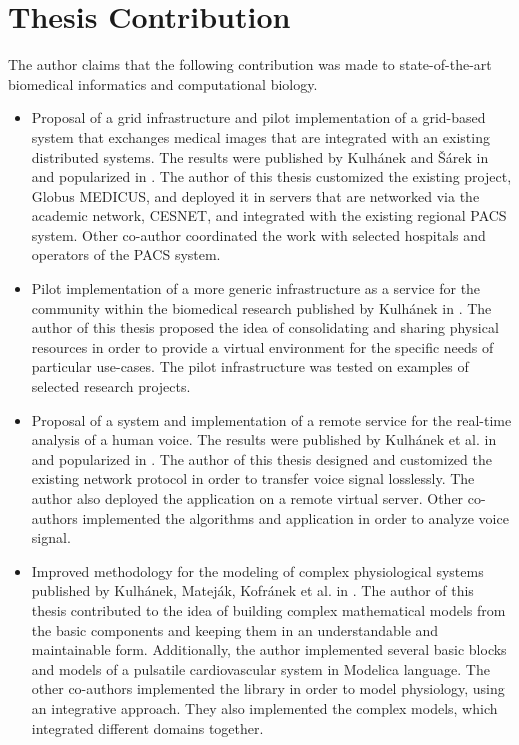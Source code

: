 \section{Thesis Contribution}
The author claims that the following contribution was made to state-of-the-art biomedical informatics and computational biology.
\begin{itemize}
\item Proposal of a grid infrastructure and pilot implementation of a grid-based system that exchanges medical images that are integrated with an existing distributed systems. The results were published by Kulhánek and Šárek in \cite{kulhanek2009} and popularized in \cite{Kulhanek2008Mefanet,Sarek2009,kulhanek2009dd}. The author of this thesis customized the existing project, Globus MEDICUS, and deployed it in servers that are networked via the academic network, CESNET, and integrated with the existing regional PACS system. Other co-author coordinated the work with selected hospitals and operators of the PACS system.
\item Pilot implementation of a more generic infrastructure as a service for the community within the biomedical research published by Kulhánek in \cite{kulhanek2010c, kulhanek2011dd}. The author of this thesis proposed the idea of consolidating and sharing physical resources in order to provide a virtual environment for the specific needs of particular use-cases. The pilot infrastructure was tested on examples of selected research projects.
\item Proposal of a system and implementation of a remote service for the real-time analysis of a human voice. The results were published by Kulhánek et al. in \cite{kulhanek2010b} and popularized in \cite{Kulhanek2010d, Kulhanek2012}. The author of this thesis designed and customized the existing network protocol in order to transfer voice signal losslessly. The author also deployed the application on a remote virtual server. Other co-authors implemented the algorithms and application in order to analyze voice signal.
\item Improved methodology for the modeling of complex physiological systems published by Kulhánek, Mateják, Kofránek et al. in \cite{Kulhanek2014Modeling, Kulhanek2014mefanet, kofranek2013hummod, Matejak2014}. The author of this thesis contributed to the idea of building complex mathematical models from the basic components and keeping them in an understandable and maintainable form. Additionally, the author implemented several basic blocks and models of a pulsatile cardiovascular system in Modelica language. The other co-authors implemented the library in order to model physiology, using an integrative approach. They also implemented the complex models, which integrated different domains together.

\end{itemize}
